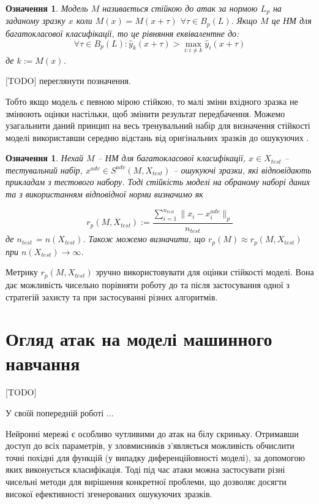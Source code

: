 \documentclass[14pt,a4paper]{extarticle}
\newcounter{e}
\newtheorem{defn}[theorem]{Означення}
\numberwithin{equation}{section}
\numberwithin{figure}{section}
\begin{document}
 \begin{defn}
 Модель $M$ називається стійкою до атак за нормою $L_p$ на заданому зразку $x$ коли $M(x)=M(x+\tau)$ $\forall \tau \in B_{p}(L) .$ Якщо $M$ це НМ для багатокласової класифікації, то це рівняння еквівалентне до:
 \begin{equation}
 \forall \tau \in B_{p}(L): \hat{y}_{k}(x+\tau)>\max _{i: i \neq k} \hat{y}_{i}(x+\tau)
 \end{equation}
 де $k:=M(x)$.
 \end{defn}
 [TODO] переглянути позначення.
 
 Тобто якщо модель є певною мірою стійкою, то малі зміни вхідного зразка не змінюють оцінки настільки, щоб змінити результат передбачення. Можемо узагальнити даний принцип на весь тренувальний набір для визначення стійкості моделі використавши середню відстань від оригінальних зразків до ошукуючих .
 
 \begin{defn}
 Нехай $M$ -- НМ для багатокласової класифікації, $x \in X_{test}$ -- тестувальний набір, $x^{adv} \in S^{adv}(M, X_{test})$ -- ошукуючі зразки, які відповідають прикладам з тестового набору. Тоді стійкість моделі на обраному наборі даних та з використанням відповідної норми визначимо як
 
 \begin{equation}
 r_p(M, X_{test}) := \frac{\sum\limits^{n_{test}}_{i = 1}\|x_i-x^{adv}_i\|_{p}}{n_{test}}
 \end{equation}
 де $n_{test}$ = $n(X_{test})$. Також можемо визначити, що $r_p(M) \approx r_p(M, X_{test})$ при $ n(X_{test}) \to \infty$.
 
 \end{defn}
 
 Метрику $r_p(M, X_{test})$ зручно використовувати для оцінки стійкості моделі. Вона дає можливість чисельно порівняти роботу до та після застосування одної з стратегій захисту та при застосуванні різних алгоритмів. 
 
 \newpage
 \thispagestyle{empty}
 \section{Огляд атак на моделі машинного навчання}
 
 [TODO]

 У своїй попередній роботі ...


 Нейронні мережі є особливо чутливими до атак на білу скриньку. Отримавши доступ до всіх параметрів, у зловмисників з'являється можливість обчислити точні похідні для функцій (у випадку диференційовності моделі), за допомогою яких виконується класифікація. Тоді під час атаки можна застосувати різні чисельні методи для вирішення конкретної проблеми, що дозволяє досягти високої ефективності згенерованих ошукуючих зразків.
\end{document}
